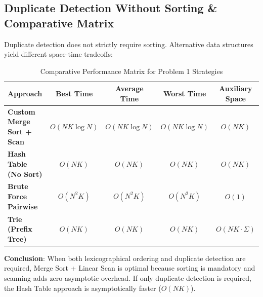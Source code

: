 \subsection{Duplicate Detection Without Sorting \& Comparative Matrix}
Duplicate detection does not strictly require sorting. Alternative data structures yield different space-time tradeoffs:

\begin{table}[htbp]
\centering
\small
\caption{Comparative Performance Matrix for Problem 1 Strategies}
\label{tab:problem1_complexity}
\begin{tabularx}{\textwidth}{@{} >{\raggedright\arraybackslash}X c c c c @{}}
\toprule
\textbf{Approach} & \textbf{Best Time} & \textbf{Average Time} & \textbf{Worst Time} & \textbf{Auxiliary Space} \\
\midrule
\textbf{Custom Merge Sort + Scan} & $O(N K \log N)$ & $O(N K \log N)$ & $O(N K \log N)$ & $O(N K)$ \\
\textbf{Hash Table (No Sort)} & $O(N K)$ & $O(N K)$ & $O(N K)$ & $O(N K)$ \\
\textbf{Brute Force Pairwise} & $O(N^2 K)$ & $O(N^2 K)$ & $O(N^2 K)$ & $O(1)$ \\
\textbf{Trie (Prefix Tree)} & $O(N K)$ & $O(N K)$ & $O(N K)$ & $O(N K \cdot \Sigma)$ \\
\bottomrule
\end{tabularx}
\end{table}

\textbf{Conclusion}: When both lexicographical ordering and duplicate detection are required, Merge Sort + Linear Scan is optimal because sorting is mandatory and scanning adds zero asymptotic overhead. If only duplicate detection is required, the Hash Table approach is asymptotically faster ($O(N K)$).
